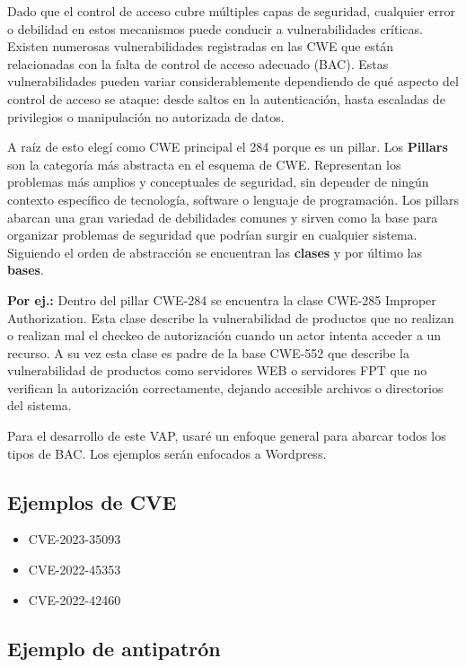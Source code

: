 Dado que el control de acceso cubre múltiples capas de seguridad, cualquier error o debilidad en estos mecanismos puede conducir a vulnerabilidades críticas. Existen numerosas vulnerabilidades registradas en las CWE que están relacionadas con la falta de control de acceso adecuado (BAC). Estas vulnerabilidades pueden variar considerablemente dependiendo de qué aspecto del control de acceso se ataque: desde saltos en la autenticación, hasta escaladas de privilegios o manipulación no autorizada de datos.

A raíz de esto elegí como CWE principal el 284 porque es un pillar. Los \textbf{Pillars }son la categoría más abstracta en el esquema de CWE. Representan los problemas más amplios y conceptuales de seguridad, sin depender de ningún contexto específico de tecnología, software o lenguaje de programación. Los pillars abarcan una gran variedad de debilidades comunes y sirven como la base para organizar problemas de seguridad que podrían surgir en cualquier sistema. Siguiendo el orden de abstracción se encuentran las \textbf{clases} y por último las \textbf{bases}. 

\textbf{Por ej.:} Dentro del pillar CWE-284 se encuentra la clase CWE-285 Improper Authorization. Esta clase describe la vulnerabilidad de productos que no realizan o realizan mal el checkeo de autorización cuando un actor intenta acceder a un recurso. A su vez esta clase es padre de la base CWE-552 que describe la vulnerabilidad de productos como servidores WEB o servidores FPT que no verifican la autorización correctamente, dejando accesible archivos o directorios del sistema.

Para el desarrollo de este VAP, usaré un enfoque general para abarcar todos los tipos de BAC. Los ejemplos serán enfocados a Wordpress.

\subsection{Ejemplos de CVE}

\begin{itemize}
    \item CVE-2023-35093
    \item CVE-2022-45353
    \item CVE-2022-42460
\end{itemize}

\subsection{Ejemplo de antipatrón}

